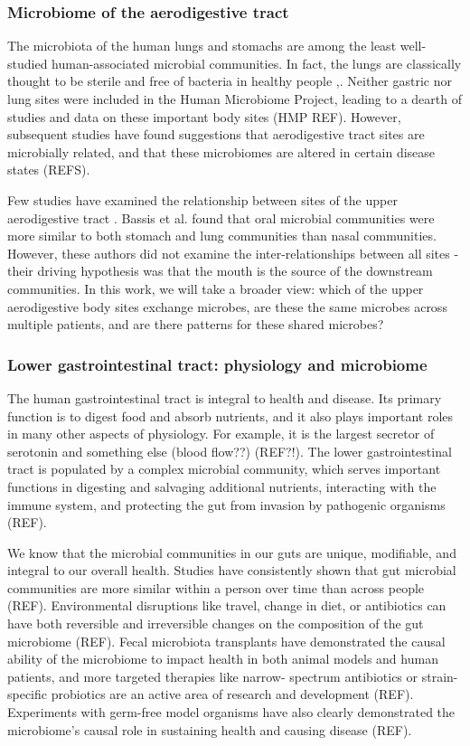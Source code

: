 \documentclass[12pt]{article}
\begin{document}
\subsubsection{Microbiome of the aerodigestive tract}
The microbiota of the human lungs and stomachs are among the least 
well-studied human-associated microbial communities. In fact, the 
lungs are classically thought to be sterile and free of bacteria in 
healthy people \cite{charslon-topographical-2011},\cite{bassis-
source-2015}. Neither gastric nor lung sites were included in the 
Human Microbiome Project, leading to a dearth of studies and data on 
these important body sites (HMP REF). However, subsequent studies have 
found suggestions that aerodigestive tract sites are microbially 
related, and that these microbiomes are altered in certain disease 
states (REFS).


Few studies have examined the relationship between sites of the upper 
aerodigestive tract \cite{bassis-source-2015}. Bassis et al. found 
that oral microbial communities were more similar to both stomach and 
lung communities than nasal communities. However, these authors did 
not examine the inter-relationships between all sites - their driving 
hypothesis was that the mouth is the source of the downstream 
communities. In this work, we will take a broader view: which of the 
upper aerodigestive body sites exchange microbes, are these the same 
microbes across multiple patients, and are there  patterns for these 
shared microbes? 

\subsubsection{Lower gastrointestinal tract: physiology and microbiome}
The human gastrointestinal tract is integral to health and disease. 
Its primary function is to digest food and absorb nutrients, and it 
also plays important roles in many other aspects of physiology. For 
example, it is the largest secretor of serotonin and something else 
(blood flow??) (REF?!). The lower gastrointestinal tract is populated 
by a complex microbial community, which serves important functions in 
digesting and salvaging additional nutrients, interacting with the 
immune system, and protecting the gut from invasion by pathogenic 
organisms (REF). 

We know that the microbial communities in our guts are unique, 
modifiable, and integral to our overall health. Studies have 
consistently shown that gut microbial communities are more similar 
within a person over time than across people (REF). Environmental 
disruptions like travel, change in diet, or antibiotics can have both 
reversible and irreversible changes on the composition of the gut 
microbiome (REF). Fecal microbiota transplants have demonstrated the 
causal ability of the microbiome to impact health in both animal 
models and human patients, and more targeted therapies like narrow-
spectrum antibiotics or strain-specific probiotics are an active area 
of research and development (REF). Experiments with germ-free model 
organisms have also clearly demonstrated the microbiome's causal role 
in sustaining health and causing disease (REF).
\end{document}
